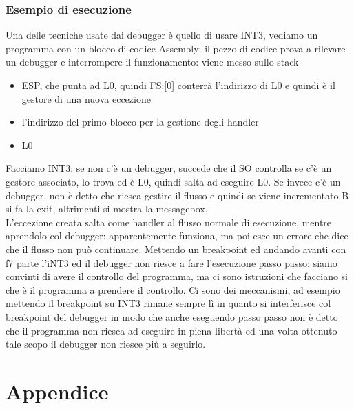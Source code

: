 \documentclass[12pt, oneside]{extbook}
\begin{document}
\subsection{Esempio di esecuzione}
Una delle tecniche usate dai debugger è quello di usare INT3, vediamo un programma con un blocco di codice Assembly: il pezzo di codice prova a rilevare un debugger e interrompere il funzionamento: viene messo sullo stack
\begin{itemize}
\item ESP, che punta ad L0, quindi FS:[0] conterrà l'indirizzo di L0 e quindi è il gestore di una nuova eccezione
\item l'indirizzo del primo blocco per la gestione degli handler
\item L0
\end{itemize}
Facciamo INT3: se non c'è un debugger, succede che il SO controlla se c'è un gestore associato, lo trova ed è L0, quindi salta ad eseguire L0. Se invece c'è un debugger, non è detto che riesca gestire il flusso e quindi se viene incrementato B si fa la exit, altrimenti si mostra la messagebox.\\L'eccezione creata salta come handler al flusso normale di esecuzione, mentre aprendolo col debugger: apparentemente funziona, ma poi esce un errore che dice che il flusso non può continuare. Mettendo un breakpoint ed andando avanti con f7 parte l'iNT3 ed il debugger non riesce a fare l'esecuzione passo passo: siamo convinti di avere il controllo del programma, ma ci sono istruzioni che facciano si che è il programma a prendere il controllo. Ci sono dei meccanismi, ad esempio mettendo il breakpoint su INT3 rimane sempre lì in quanto si interferisce col breakpoint del debugger in modo che anche eseguendo passo passo non è detto che il programma non riesca ad eseguire in piena libertà ed una volta ottenuto tale scopo il debugger non riesce più a seguirlo.










\newpage
\chapter*{Appendice}
\end{document}
